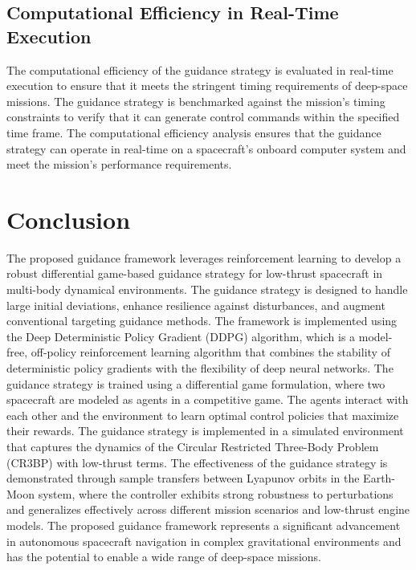 \documentclass[conference]{IEEEtran}
\begin{document}
\subsection{Computational Efficiency in Real-Time Execution}
The computational efficiency of the guidance strategy is evaluated in real-time execution to ensure that it meets the stringent timing requirements of deep-space missions. The guidance strategy is benchmarked against the mission's timing constraints to verify that it can generate control commands within the specified time frame. The computational efficiency analysis ensures that the guidance strategy can operate in real-time on a spacecraft's onboard computer system and meet the mission's performance requirements.
\section{Conclusion}
The proposed guidance framework leverages reinforcement learning to develop a robust differential game-based guidance strategy for low-thrust spacecraft in multi-body dynamical environments. The guidance strategy is designed to handle large initial deviations, enhance resilience against disturbances, and augment conventional targeting guidance methods. The framework is implemented using the Deep Deterministic Policy Gradient (DDPG) algorithm, which is a model-free, off-policy reinforcement learning algorithm that combines the stability of deterministic policy gradients with the flexibility of deep neural networks. The guidance strategy is trained using a differential game formulation, where two spacecraft are modeled as agents in a competitive game. The agents interact with each other and the environment to learn optimal control policies that maximize their rewards. The guidance strategy is implemented in a simulated environment that captures the dynamics of the Circular Restricted Three-Body Problem (CR3BP) with low-thrust terms. The effectiveness of the guidance strategy is demonstrated through sample transfers between Lyapunov orbits in the Earth-Moon system, where the controller exhibits strong robustness to perturbations and generalizes effectively across different mission scenarios and low-thrust engine models. The proposed guidance framework represents a significant advancement in autonomous spacecraft navigation in complex gravitational environments and has the potential to enable a wide range of deep-space missions.
\end{document}
